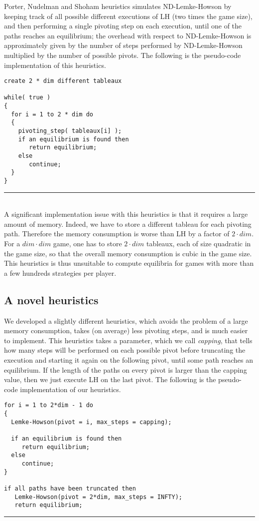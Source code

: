 \documentclass[11pt]{article}
\begin{document}
Porter, Nudelman and Shoham heuristics \cite{simple} simulates
ND-Lemke-Howson by keeping track of all possible different
executions of LH (two times the game size), and then performing a
single pivoting step on each execution, until one of the paths
reaches an equilibrium; the overhead with respect to ND-Lemke-Howson
is approximately given by the number of steps performed by
ND-Lemke-Howson multiplied by the number of possible pivots. The
following is the pseudo-code implementation of this heuristics.

\noindent
\makebox[\textwidth]{\hrulefill}
\begin{verbatim}
create 2 * dim different tableaux

while( true )
{
  for i = 1 to 2 * dim do
  {
    pivoting_step( tableaux[i] );
    if an equilibrium is found then
       return equilibrium;
    else
       continue;
  }
}
\end{verbatim}
\hrule
\hfill\\

A significant implementation issue with this heuristics is that it
requires a large amount of memory. Indeed, we have to store a
different tableau for each pivoting path. Therefore the memory
consumption is worse than LH by a factor of $2 \cdot dim$. For a
$dim \cdot dim$ game, one has to store $2 \cdot dim$ tableaux, each
of size quadratic in the game size, so that the overall memory
consumption is cubic in the game size. This heuristics is thus
unsuitable to compute equilibria for games with more
than a few hundreds strategies per player.

\subsection{A novel heuristics}

We developed a slightly different heuristics, which avoids the
problem of a large memory consumption, takes (on average) less
pivoting steps, and is much easier to implement.
This heuristics takes a parameter, which we call \textit{capping},
that tells how
many steps will be performed on each possible pivot before
truncating the execution and starting it again on the following
pivot, until some path reaches an equilibrium. If the length of the paths on every
pivot is larger than the capping value, then we just execute LH on
the last pivot. The following is the pseudo-code implementation
of our heuristics.

\noindent
\makebox[\textwidth]{\hrulefill}
\begin{verbatim}
for i = 1 to 2*dim - 1 do
{
  Lemke-Howson(pivot = i, max_steps = capping);

  if an equilibrium is found then
     return equilibrium;
  else
     continue;
}

if all paths have been truncated then
   Lemke-Howson(pivot = 2*dim, max_steps = INFTY);
   return equilibrium;
\end{verbatim}
\hrule\hfill\\
\end{document}
